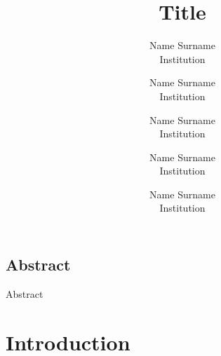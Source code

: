 \documentclass[letterpaper,twocolumn,10pt]{article}
\begin{document}
\date{}
\title{\Large \bf Title}

\author{
{\rm Name Surname}\\
Institution
\and
{\rm Name Surname}\\
Institution
\and
{\rm Name Surname}\\
Institution
\and
{\rm Name Surname}\\
Institution
\and
{\rm Name Surname}\\
Institution
} %

\maketitle



\subsection*{Abstract}
Abstract

\section{Introduction}
\label{sec:Introduction}


{\footnotesize 
}
\end{document}
